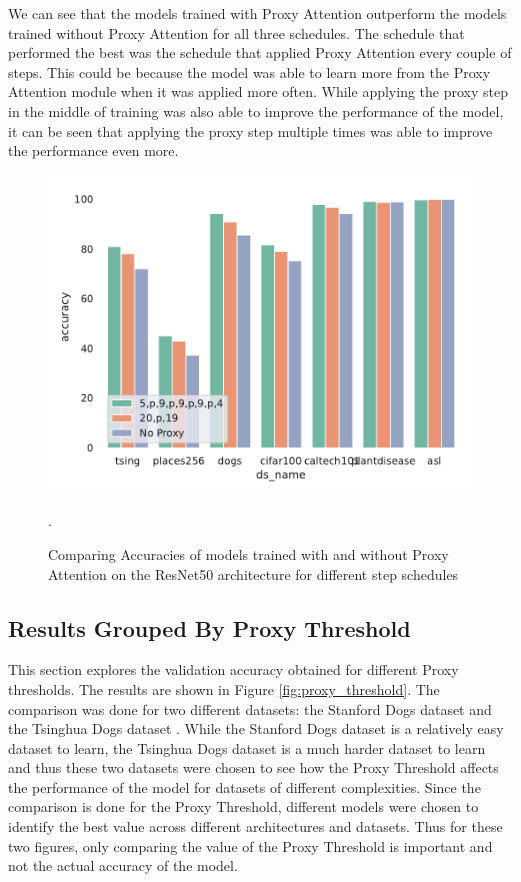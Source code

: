 We can see that the models trained with Proxy Attention outperform the models trained without Proxy Attention for all three schedules. The schedule that performed the best was the schedule that applied Proxy Attention every couple of steps. This could be because the model was able to learn more from the Proxy Attention module when it was applied more often. While applying the proxy step in the middle of training was also able to improve the performance of the model, it can be seen that applying the proxy step multiple times was able to improve the performance even more.
\begin{figure}[!htb]
    \centering
    \includegraphics[width=.6\textwidth]{results/schedule_resnet50.pdf}
    \caption{Comparing Accuracies of models trained with and without Proxy Attention on the ResNet50 \cite{heDeepResidualLearning2016} architecture for different step schedules}.
    \label{fig:schedresnet50_results}
\end{figure}

\subsection{Results Grouped By Proxy Threshold}
This section explores the validation accuracy obtained for different Proxy thresholds. The results are shown in Figure \ref{fig:proxy_threshold}. 
The comparison was done for two different datasets: the Stanford Dogs dataset \cite{khoslaNovelDatasetFineGrained} and the Tsinghua Dogs dataset \cite{zouNewDatasetDog2020}. While the Stanford Dogs dataset is a relatively easy dataset to learn, the Tsinghua Dogs dataset is a much harder dataset to learn and thus these two datasets were chosen to see how the Proxy Threshold affects the performance of the model for datasets of different complexities. Since the comparison is done for the Proxy Threshold, different models were chosen to identify the best value across different architectures and datasets. Thus for these two figures, only comparing the value of the Proxy Threshold is important and not the actual accuracy of the model.

